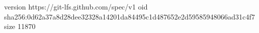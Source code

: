 version https://git-lfs.github.com/spec/v1
oid sha256:0d62a37a8d28dee32328a14201da84495c1d487652e2d59585948066ad31c4f7
size 11870
